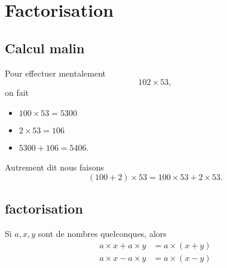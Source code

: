 \section{Factorisation}



\subsection{Calcul malin}

Pour effectuer mentalement
\begin{equation}
    102\times 53,
\end{equation}
on fait
\begin{itemize}
    \item \( 100\times 53=5300\)
    \item \( 2\times 53=106\)
    \item \( 5300+106=5406\).
\end{itemize}
Autrement dit nous faisons
\begin{equation}
    (100+2)\times 53=100\times 53+2\times 53.
\end{equation}

\subsection{factorisation}

Si \( a,x,y\) sont de nombres quelconques, alors
\begin{subequations}
    \begin{align}
        a\times x+a\times y&=a\times (x+y)\\
        a\times x-a\times y&=a\times (x-y)
    \end{align}
\end{subequations}

